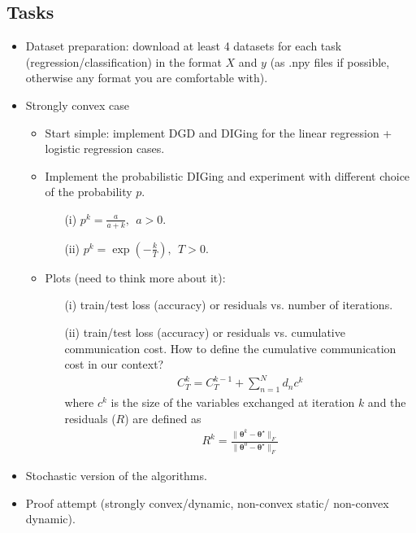 \documentclass[12pt,draftclsnofoot,onecolumn]{IEEEtran}
\begin{document}
\subsection{Tasks}
\begin{itemize}
\item Dataset preparation: download at least 4 datasets for each task (regression/classification) in the format $X$ and $y$ (as .npy files if possible, otherwise any format you are comfortable with).
\item Strongly convex case
\begin{itemize}
\item Start simple: implement DGD and DIGing for the linear regression + logistic regression cases.
\item Implement the probabilistic DIGing and experiment with different choice of the probability $p$.
\begin{itemize}
\item[(i)] $p^k = \frac{a}{a + k}, ~~ a > 0$.
\item[(ii)] $p^k = \exp\left(-\frac{k}{T}\right), ~~ T > 0$.
\end{itemize}
\item Plots (need to think more about it): 
\begin{itemize}
\item[(i)] train/test loss (accuracy) or residuals vs. number of iterations.
\item[(ii)] train/test loss (accuracy) or residuals vs. cumulative communication cost. How to define the cumulative communication cost in our context?
\begin{align}
C_T^k = C_T^{k-1} + \sum_{n=1}^N d_n c^k
\end{align}
where $c^k$ is the size of the variables exchanged at iteration $k$ and the residuals ($R$) are defined as
\begin{align}
R^k = \frac{\|\bm{\theta}^k - \bm{\theta}^{\star}\|_F}{\|\bm{\theta}^0 - \bm{\theta}^{\star}\|_F}
\end{align}
\end{itemize}
\end{itemize}
\item Stochastic version of the algorithms.
\item Proof attempt (strongly convex/dynamic, non-convex static/ non-convex dynamic).
\end{itemize}

%
%
%
%
%
%

%
%
\end{document}
